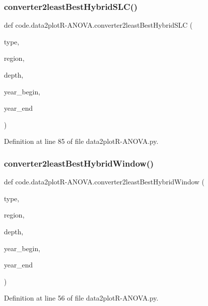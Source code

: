 \subsubsection{\texorpdfstring{converter2least\+Best\+Hybrid\+S\+L\+C()}{converter2leastBestHybridSLC()}}
{\footnotesize\ttfamily def code.\+data2plotR-\/A\+N\+O\+V\+A.\+converter2least\+Best\+Hybrid\+S\+LC (\begin{DoxyParamCaption}\item[{}]{type,  }\item[{}]{region,  }\item[{}]{depth,  }\item[{}]{year\+\_\+begin,  }\item[{}]{year\+\_\+end }\end{DoxyParamCaption})}



Definition at line 85 of file data2plot\+R-\/\+A\+N\+O\+V\+A.\+py.

\mbox{\label{namespacecode_1_1data2plot_r-_a_n_o_v_a_a4c41130d0551498496f6a504dc116760}} 
\subsubsection{\texorpdfstring{converter2least\+Best\+Hybrid\+Window()}{converter2leastBestHybridWindow()}}
{\footnotesize\ttfamily def code.\+data2plotR-\/A\+N\+O\+V\+A.\+converter2least\+Best\+Hybrid\+Window (\begin{DoxyParamCaption}\item[{}]{type,  }\item[{}]{region,  }\item[{}]{depth,  }\item[{}]{year\+\_\+begin,  }\item[{}]{year\+\_\+end }\end{DoxyParamCaption})}



Definition at line 56 of file data2plot\+R-\/\+A\+N\+O\+V\+A.\+py.

\mbox{\label{namespacecode_1_1data2plot_r-_a_n_o_v_a_a06e015f60ef6222c28908514b28475d3}} 
